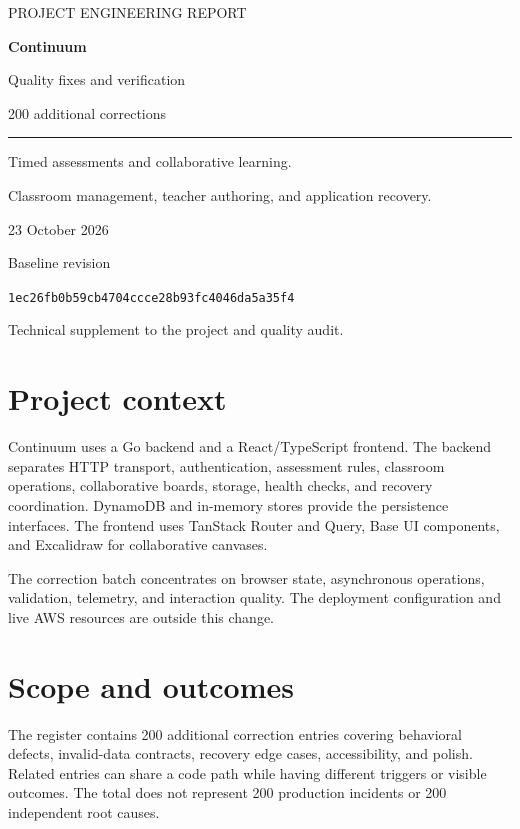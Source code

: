 \documentclass[10pt,a4paper]{article}
\begin{document}
\begin{titlepage}
\color{ink}
{\large\color{accent}PROJECT ENGINEERING REPORT\par}
\vspace{20mm}
{\Huge\bfseries Continuum\par}
\vspace{5mm}
{\LARGE Quality fixes and verification\par}
\vspace{8mm}
{\large 200 additional corrections\par}
\vspace{8mm}
\noindent\rule{\textwidth}{0.8pt}
\vspace{8mm}
Timed assessments and collaborative learning.\par
Classroom management, teacher authoring, and application recovery.
\vfill
{\large 23 October 2026\par}
Baseline revision\par
{\footnotesize\texttt{1ec26fb0b59cb4704ccce28b93fc4046da5a35f4}\par}
\vspace{6mm}
Technical supplement to the project and quality audit.
\end{titlepage}
\section{Project context}
Continuum uses a Go backend and a React/TypeScript frontend. The backend separates HTTP transport, authentication, assessment rules, classroom operations, collaborative boards, storage, health checks, and recovery coordination. DynamoDB and in-memory stores provide the persistence interfaces. The frontend uses TanStack Router and Query, Base UI components, and Excalidraw for collaborative canvases.

The correction batch concentrates on browser state, asynchronous operations, validation, telemetry, and interaction quality. The deployment configuration and live AWS resources are outside this change.

\section{Scope and outcomes}
The register contains 200 additional correction entries covering behavioral defects, invalid-data contracts, recovery edge cases, accessibility, and polish. Related entries can share a code path while having different triggers or visible outcomes. The total does not represent 200 production incidents or 200 independent root causes.
\end{document}

